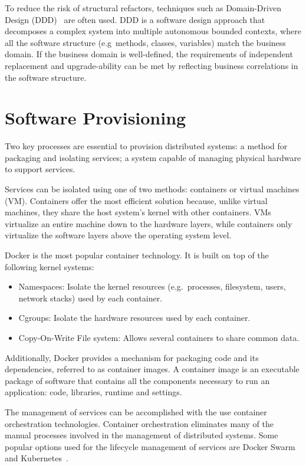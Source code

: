 To reduce the risk of structural refactors, techniques such as Domain-Driven Design (DDD)~\cite{ddd} are often used.
DDD is a software design approach that decomposes a complex system into multiple autonomous bounded contexts,
where all the software structure (e.g\ methods, classes, variables) match the business domain.
If the business domain is well-defined, the requirements of independent replacement and upgrade-ability can be met by reflecting business correlations in the software structure.

\section{Software Provisioning} %
\label{sec:software_provisioning}

Two key processes are essential to provision distributed systems:
a method for packaging and isolating services;
a system capable of managing physical hardware to support services.

Services can be isolated using one of two methods: containers or virtual machines (VM).
Containers offer the most efficient solution because, unlike virtual machines, they share the host system's kernel with other containers.
VMs virtualize an entire machine down to the hardware layers, while containers only virtualize the software layers above the operating system level.

Docker \cite{docker} is the most popular container technology. It is built on top of the following kernel systems:
\begin{itemize}
    \item Namespaces: Isolate the kernel resources (e.g.\ processes, filesystem, users, network stacks) used by each container.
    \item Cgroups: Isolate the hardware resources used by each container.
    \item Copy-On-Write File system: Allows several containers to share common data.
\end{itemize}

Additionally, Docker provides a mechanism for packaging code and its dependencies, referred to as container images.
A container image is an executable package of software that contains all the components necessary to run an application: code, libraries, runtime and settings.

The management of services can be accomplished with the use container orchestration technologies.
Container orchestration eliminates many of the manual processes involved in the management of distributed systems.
Some popular options used for the lifecycle management of services are Docker Swarm~\cite{docker2016swarm} and Kubernetes~\cite{kubernetes}.

